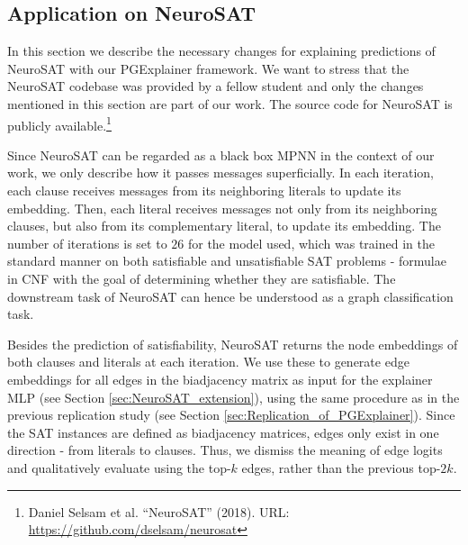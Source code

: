 \subsection{Application on NeuroSAT}
\label{sec:Application_to_NeuroSAT}

In this section we describe the necessary changes for explaining predictions of NeuroSAT \cite{selsam2018learning} with our PGExplainer framework. We want to stress that the NeuroSAT codebase was provided by a fellow student and only the changes mentioned in this section are part of our work. The source code for NeuroSAT is publicly available.\footnote{Daniel Selsam et al. “NeuroSAT” (2018). URL: \url{https://github.com/dselsam/neurosat}} \bigskip

Since NeuroSAT can be regarded as a black box MPNN in the context of our work, we only describe how it passes messages superficially. In each iteration, each clause receives messages from its neighboring literals to update its embedding. Then, each literal receives messages not only from its neighboring clauses, but also from its complementary literal, to update its embedding. The number of iterations is set to $26$ for the model used, which was trained in the standard manner on both satisfiable and unsatisfiable SAT problems - formulae in CNF with the goal of determining whether they are satisfiable. The downstream task of NeuroSAT can hence be understood as a graph classification task.

Besides the prediction of satisfiability, NeuroSAT returns the node embeddings of both clauses and literals at each iteration. We use these to generate edge embeddings for all edges in the biadjacency matrix as input for the explainer MLP (see Section \ref{sec:NeuroSAT_extension}), using the same procedure as in the previous replication study (see Section \ref{sec:Replication_of_PGExplainer}). Since the SAT instances are defined as biadjacency matrices, edges only exist in one direction - from literals to clauses. Thus, we dismiss the meaning of edge logits and qualitatively evaluate using the top-$k$ edges, rather than the previous top-$2k$. \bigskip

